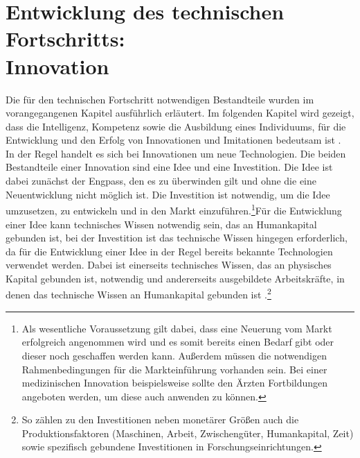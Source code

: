 \section[Entwicklung des technischen Fortschritts: Innovation]{Entwicklung des technischen Fortschritts:\\ Innovation }
Die für den technischen Fortschritt notwendigen Bestandteile wurden im vorangegangenen Kapitel ausführlich erläutert. Im folgenden Kapitel wird gezeigt, dass die Intelligenz, Kompetenz sowie die Ausbildung eines Individuums, f{\"u}r die Entwicklung und den Erfolg von Innovationen und Imitationen bedeutsam ist \citep{Hassler.2000}.\\


In der Regel handelt es sich bei Innovationen um neue Technologien. Die beiden Bestandteile einer Innovation sind eine Idee und eine Investition. Die Idee ist dabei zunächst der Engpass, den es zu überwinden gilt und ohne die eine Neuentwicklung nicht möglich ist. Die Investition ist notwendig, um die Idee umzusetzen, zu entwickeln und in den Markt einzuf{\"u}hren.\footnote{Als wesentliche Voraussetzung gilt dabei, dass eine Neuerung vom Markt erfolgreich angenommen wird und es somit bereits einen Bedarf gibt oder dieser noch geschaffen werden kann. Au{\ss}erdem müssen die notwendigen Rahmenbedingungen für die Markteinführung vorhanden sein. Bei einer medizinischen Innovation beispielsweise sollte den {\"A}rzten Fortbildungen angeboten werden, um diese auch anwenden zu können.}\newline F{\"u}r die Entwicklung einer Idee kann technisches Wissen notwendig sein, das an Humankapital gebunden ist, bei der Investition ist das technische Wissen hingegen erforderlich, da f{\"u}r die Entwicklung einer Idee in der Regel bereits bekannte Technologien verwendet werden. Dabei ist einerseits technisches Wissen, das an physisches Kapital gebunden ist, notwendig und andererseits ausgebildete Arbeitskr{\"a}fte, in denen das technische Wissen an Humankapital gebunden ist \citep{Scotchmer.2004}.\footnote{So zählen zu den Investitionen neben monet{\"a}rer Gr{\"o}{\ss}en auch die Produktionsfaktoren (Maschinen, Arbeit, Zwischengüter, Humankapital, Zeit) sowie spezifisch gebundene Investitionen in Forschungseinrichtungen.}\newline 



